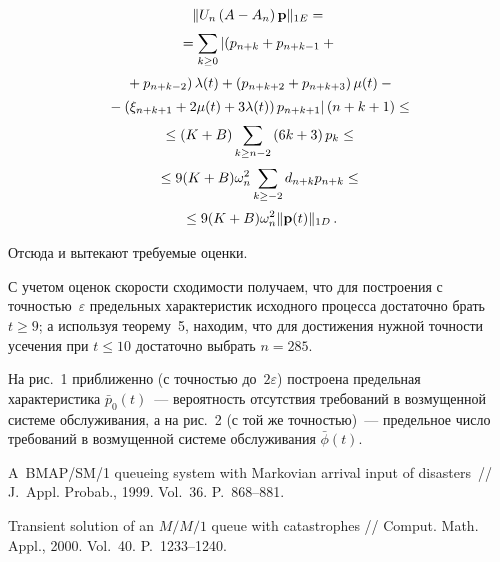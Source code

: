 \begin{multicols}{2}



\noindent
\begin{multline*}
\|U_n \left(A -A_n \right) {\bf p}\|_{1E} = {}\\[2pt]
{}=
 \sum\limits_{k  \ge 0} \left| \left(p_{n+k}+p_{n+k-1} +{}\right.\right.\\[2pt]
\left. {}+p_{n+k-2}\right)\lambda(t)+
 \left(p_{n+k+2}+p_{n+k+3}\right)\mu(t) -{}   \\[2pt]
 \left.{}- \left(\xi_{n+k+1}+2\mu(t)+3\lambda(t)\right)p_{n+k+1} \right|  (n+k+1) \le{}\\[2pt]
{}\le (K+B) \sum\limits_{k\ge n-2}{\left(6k+3\right)p_k}\le {}\\[2pt]
{}\le 9(K+B)\omega_n^2 \sum\limits_{k \ge -2}{d_{n+k}p_{n+k}} \le{}\\[2pt]
{}\le  9(K+B)\omega_n^2 \| {\bf p}(t)\|_{1D}\, .
\end{multline*}




Отсюда и вытекают требуемые оценки.
\bigskip

С учетом оценок скорости сходимости получаем, что для построения с точностью~$\varepsilon$ 
предельных характеристик исходного процесса достаточно брать $t \ge 9$; а используя теорему~5, 
находим, что для достижения нужной точности усечения при $t \le 10$ достаточно выбрать $n=285$.


На рис.~1 приближенно (с
точностью до~$2\varepsilon$) построена предельная характеристика
$\bar{p}_0(t)$~--- вероятность отсутствия требований в возмущенной
системе обслуживания, а на рис.~2 (с той же точ\-ностью)~--- предельное
число требований  в возмущенной сис\-те\-ме обслуживания
$\bar{\phi}(t)$.




{\small\frenchspacing
{%
\begin{thebibliography}{99}


A~BMAP/SM/1 queueing system with Markovian arrival input of disasters~//
J.~Appl. Probab., 1999. Vol.~36. P.~868--881.

Transient solution of an
$M/M/1$ queue with catastrophes // Comput. Math. Appl., 2000. Vol.~40. P.~1233--1240.


\end{thebibliography}}}
\end{multicols}
